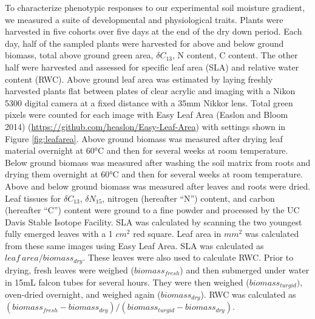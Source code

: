 \documentclass[jou,floatsintext]{apa6}
\begin{document}
To characterize phenotypic responses to our experimental soil moisture gradient, we measured a suite of developmental and physiological traits. Plants were harvested in five cohorts over five days at the end of the dry down period. Each day, half of the sampled plants were harvested for above and below ground biomass, total above ground green area, \(\delta C_{13}\), N content, C content. The other half were harvested and assessed for specific leaf area (SLA) and relative water content (RWC). Above ground leaf area was estimated by laying freshly harvested plants flat between plates of clear acrylic and imaging with a Nikon 5300 digital camera at a fixed distance with a 35mm Nikkor lens. Total green pixels were counted for each image with Easy Leaf Area (Easlon and Bloom 2014) (\url{https://github.com/heaslon/Easy-Leaf-Area}) with settings shown in Figure \ref{fig:leafarea}. Above ground biomass was measured after drying leaf material overnight at 60°C and then for several weeks at room temperature. Below ground biomass was measured after washing the soil matrix from roots and drying them overnight at 60°C and then for several weeks at room temperature. Above and below ground biomass was measured after leaves and roots were dried. Leaf tissues for \(\delta C_{13}\), \(\delta N_{15}\), nitrogen (hereafter \enquote{N}) content, and carbon (hereafter \enquote{C}) content were ground to a fine powder and processed by the UC Davis Stable Isotope Facility. SLA was calculated by scanning the two youngest fully emerged leaves with a 1 \(cm^2\) red square. Leaf area in \(mm^2\) was calculated from these same images using Easy Leaf Area. SLA was calculated as \(leaf\ area / biomass_{dry}\). These leaves were also used to calculate RWC. Prior to drying, fresh leaves were weighed (\(biomass_{fresh}\)) and then submerged under water in 15mL falcon tubes for several hours. They were then weighed (\(biomass_{turgid})\), oven-dried overnight, and weighed again (\(biomass_{dry}\)). RWC was calculated as \((biomass_{fresh}-biomass_{dry})/(biomass_{turgid}-biomass_{dry})\).
\end{document}
